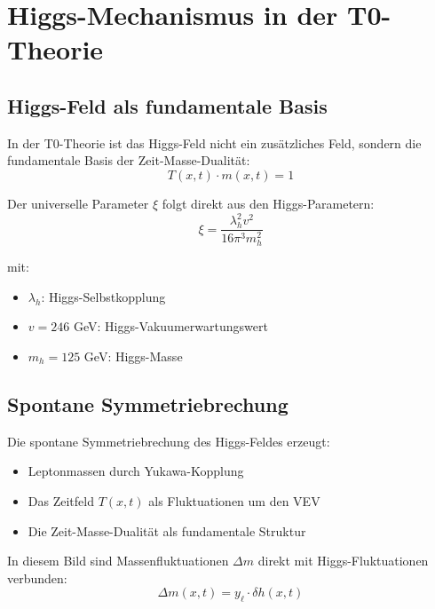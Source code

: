 	\section{Higgs-Mechanismus in der T0-Theorie}
	
	\subsection{Higgs-Feld als fundamentale Basis}
	
	In der T0-Theorie ist das Higgs-Feld nicht ein zusätzliches Feld, sondern die fundamentale Basis der Zeit-Masse-Dualität:
	\begin{equation}
		T(x,t) \cdot m(x,t) = 1
		\label{eq:higgs_foundation}
	\end{equation}
	
	Der universelle Parameter $\xi$ folgt direkt aus den Higgs-Parametern:
	\begin{equation}
		\boxed{\xi = \frac{\lambda_h^2 v^2}{16\pi^3 m_h^2}}
		\label{eq:xi_from_higgs}
	\end{equation}
	
	mit:
	\begin{itemize}
		\item $\lambda_h$: Higgs-Selbstkopplung
		\item $v = 246$ GeV: Higgs-Vakuumerwartungswert
		\item $m_h = 125$ GeV: Higgs-Masse
	\end{itemize}
	
	\subsection{Spontane Symmetriebrechung}
	
	Die spontane Symmetriebrechung des Higgs-Feldes erzeugt:
	\begin{itemize}
		\item Leptonmassen durch Yukawa-Kopplung
		\item Das Zeitfeld $T(x,t)$ als Fluktuationen um den VEV
		\item Die Zeit-Masse-Dualität als fundamentale Struktur
	\end{itemize}
	
	In diesem Bild sind Massenfluktuationen $\Delta m$ direkt mit Higgs-Fluktuationen verbunden:
	\begin{equation}
		\Delta m(x,t) = y_\ell \cdot \delta h(x,t)
		\label{eq:higgs_fluctuation}
	\end{equation}
	
